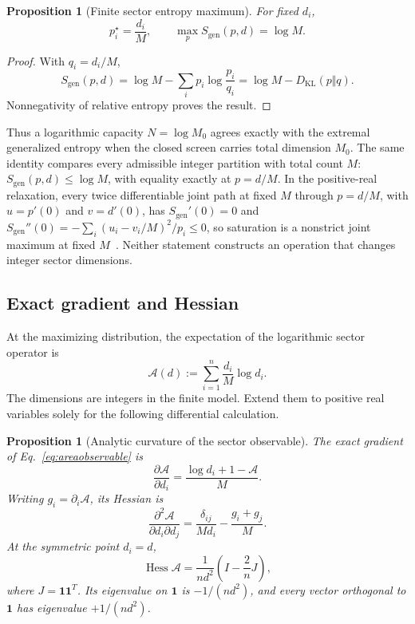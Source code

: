 \documentclass[11pt]{article}
\newtheorem{proposition}[theorem]{Proposition}
\theoremstyle{remark}
\newcommand{\one}{\mathbf 1}
\newcommand{\Hess}{\operatorname{Hess}}
\newcommand{\KL}{D_{\mathrm{KL}}}
\begin{document}
\begin{proposition}[Finite sector entropy maximum]
\label{prop:entropymax}
For fixed \(d_i\),
\[
p_i^\star=\frac{d_i}{M},
\qquad
\max_p S_{\mathrm{gen}}(p,d)=\log M.
\]
\end{proposition}

\begin{proof}
With \(q_i=d_i/M\),
\[
S_{\mathrm{gen}}(p,d)
=\log M-\sum_i p_i\log\frac{p_i}{q_i}
=\log M-\KL(p\Vert q).
\]
Nonnegativity of relative entropy proves the result.
\end{proof}

Thus a logarithmic capacity \(N=\log M_0\) agrees exactly with the extremal
generalized entropy when the closed screen carries total dimension \(M_0\).
The same identity compares every admissible integer partition with total
count \(M\): \(S_{\mathrm{gen}}(p,d)\le\log M\), with equality exactly at
\(p=d/M\). In the positive-real relaxation, every twice differentiable joint
path at fixed \(M\) through \(p=d/M\), with \(u=p'(0)\) and \(v=d'(0)\), has
\(S_{\mathrm{gen}}'(0)=0\) and
\(S_{\mathrm{gen}}''(0)=-\sum_i(u_i-v_i/M)^2/p_i\le0\), so saturation is a
nonstrict joint maximum at fixed \(M\)~\cite{ophentropy}. Neither statement
constructs an operation that changes integer sector dimensions.

\subsection{Exact gradient and Hessian}

At the maximizing distribution, the expectation of the logarithmic sector
operator is
\begin{equation}
\mathcal A(d)
:=\sum_{i=1}^n\frac{d_i}{M}\log d_i .
\label{eq:areaobservable}
\end{equation}
The dimensions are integers in the finite model. Extend them to positive
real variables solely for the following differential calculation.

\begin{proposition}[Analytic curvature of the sector observable]
\label{prop:hessian}
The exact gradient of Eq.~\eqref{eq:areaobservable} is
\begin{equation}
\frac{\partial\mathcal A}{\partial d_i}
=\frac{\log d_i+1-\mathcal A}{M}.
\label{eq:gradient}
\end{equation}
Writing \(g_i=\partial_i\mathcal A\), its Hessian is
\begin{equation}
\frac{\partial^2\mathcal A}{\partial d_i\partial d_j}
=\frac{\delta_{ij}}{M d_i}-\frac{g_i+g_j}{M}.
\label{eq:hessiangeneral}
\end{equation}
At the symmetric point \(d_i=d\),
\begin{equation}
\Hess\mathcal A
=\frac1{n d^2}\left(I-\frac2nJ\right),
\label{eq:hessiansymmetric}
\end{equation}
where \(J=\one\one^T\). Its eigenvalue on \(\one\) is
\(-1/(nd^2)\), and every vector orthogonal to \(\one\) has eigenvalue
\(+1/(nd^2)\).
\end{proposition}
\end{document}
